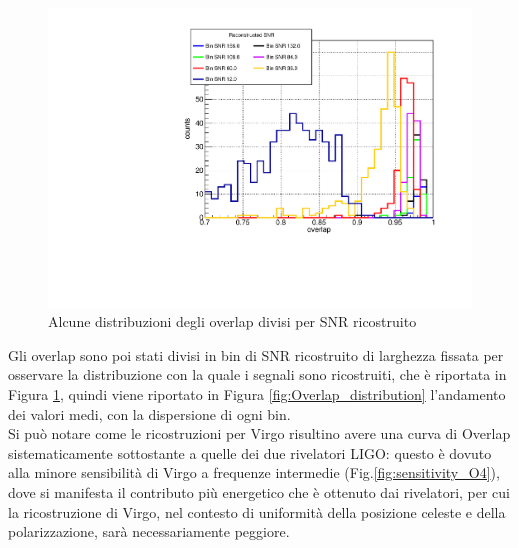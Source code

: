 \begin{figure}
	\vspace{-20pt}
	\begin{center}
		\includegraphics[width=.30\textwidth]{figures/Capitolo_3/report/OverlapDistributionsALLDetector3SHT2_0spin1.pdf}
	\end{center}
	\vspace{-12pt}
	\caption{Alcune distribuzioni degli overlap divisi per SNR ricostruito}
	\label{fig:overlaps_histo}
	\vspace{-10pt}
\end{figure}
Gli overlap sono poi stati divisi in bin di SNR ricostruito di larghezza fissata per osservare la distribuzione con la quale i segnali sono ricostruiti, che è riportata in Figura \ref{fig:overlaps_histo}, quindi viene riportato in Figura \ref{fig:Overlap_distribution} l'andamento dei valori medi, con la dispersione di ogni bin.\\
Si può notare come le ricostruzioni per Virgo risultino avere una curva di Overlap sistematicamente sottostante a quelle dei due rivelatori LIGO: questo è dovuto alla minore sensibilità di Virgo a frequenze intermedie (Fig.\ref{fig:sensitivity_O4}), dove si manifesta il contributo più energetico che è ottenuto dai rivelatori, per cui la ricostruzione di Virgo, nel contesto di uniformità della posizione celeste e della polarizzazione, sarà necessariamente peggiore.

